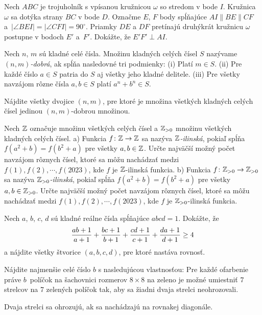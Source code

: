 {%
Nech $ABC$ je trojuholník s vpísanou kružnicou $\omega$ so stredom v bode $I$. Kružnica $\omega$ sa dotýka strany $BC$ v bode $D$. Označme $E$, $F$ body spĺňajúce $AI \parallel BE \parallel CF$ a~$|\angle BEI| = |\angle CFI| = 90^\circ.$ Priamky $DE$ a $DF$ pretínajú druhýkrát kružnicu $\omega$ postupne v bodoch $E'$ a~$F'$. Dokážte, že $E'F' \perp AI$.}

{%
Nech $n$, $m$ sú kladné celé čísla. Množinu kladných celých čísel $S$ nazývame \emph{$(n, m)$-dobrá}, ak spĺňa nasledovné tri podmienky:
\ite (i) Platí $m \in S$.
\ite (ii) Pre každé číslo $a \in S$ patria do $S$ aj všetky jeho kladné delitele.
\ite (iii) Pre všetky navzájom rôzne čísla $a, b \in S$ platí $a^n + b^n \in S$.

\noindent
Nájdite všetky dvojice $(n,m)$, pre ktoré je množina všetkých kladných celých čísel jedinou $(n,m)$-dobrou množinou.}

{%
Nech $\Bbb Z$ označuje množinu všetkých celých čísel a $\Bbb Z_{>0}$ množinu všetkých kladných celých čísel.
\ite a) Funkcia $f\colon\Bbb Z\to\Bbb Z$ sa nazýva \emph{$\Bbb Z$-ilinská}, pokiaľ spĺňa $f(a^2+b)=f(b^2+a)$ pre všetky $a,b\in\Bbb Z$.
Určte najväčší možný počet navzájom rôznych čísel, ktoré sa môžu nachádzať medzi $f(1),f(2), \cdots, f(2023)$, kde $f$ je $\Bbb Z$-ilinská funkcia.
\ite b) Funkcia $f\colon\Bbb Z_{>0}\to\Bbb Z_{>0}$ sa nazýva \emph{$\Bbb Z_{>0}$-ilinská}, pokiaľ spĺňa $f(a^2+b)=f(b^2+a)$ pre všetky $a,b\in\Bbb Z_{>0}$. Určte najväčší možný počet navzájom rôznych čísel, ktoré sa môžu nachádzať medzi $f(1),f(2), \cdots, f(2023)$, kde $f$ je $\Bbb Z_{>0}$-ilinská funkcia.\endgraf
}

{%
Nech $a$, $b$, $c$, $d$ sú kladné reálne čísla spĺňajúce $abcd=1$.
Dokážte, že
$$
\postdisplaypenalty=10000
\frac{ab+1}{a+1}+\frac{bc+1}{b+1}+\frac{cd+1}{c+1}+\frac{da+1}{d+1}\ge4
$$
a nájdite všetky štvorice $(a,b,c,d)$, pre ktoré nastáva rovnosť.}

{%
Nájdite najmenšie celé číslo $b$ s nasledujúcou vlastnosťou: Pre každé ofarbenie práve $b$~políčok na šachovnici rozmerov $8 \times 8$ na zeleno je možné umiestniť 7 strelcov na 7 zelených políčok tak, aby sa žiadni dvaja strelci neohrozovali.

\poznamka
Dvaja strelci sa ohrozujú, ak sa nachádzajú na rovnakej diagonále.
}

